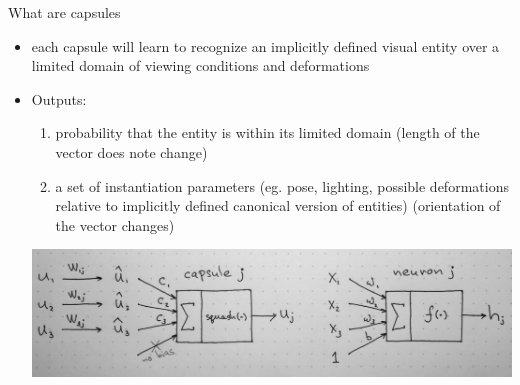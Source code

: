 \documentclass{beamer}
\begin{document}
\begin{frame}{What are capsules}
    \begin{itemize}
    \item{
    each capsule will learn to recognize an implicitly defined visual entity over a limited domain of viewing conditions and deformations}
    \item {
    Outputs:
    }
    \begin{enumerate}
        
        \item probability that the entity is within its limited domain (length of the vector does note change)
        \item a set of instantiation parameters (eg. pose, lighting, possible deformations relative to implicitly defined canonical version of entities) (orientation of the vector changes)
        
    \end{enumerate}
    
    \centering
    \includegraphics[scale = 0.4]{capsules.JPG}
    
    \end{itemize}
\end{frame}
\end{document}
